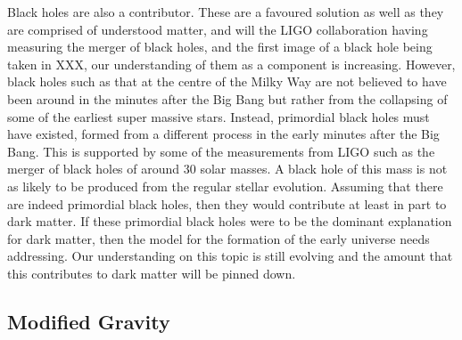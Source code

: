 \par
Black holes are also a contributor. 
These are a favoured solution as well as they are comprised of understood matter, and will the LIGO collaboration having measuring the merger of black holes, and the first image of a black hole being taken in XXX, our understanding of them as a component is increasing.
However, black holes such as that at the centre of the Milky Way are not believed to have been around in the minutes after the Big Bang but rather from the collapsing of some of the earliest super massive stars.
Instead, primordial black holes must have existed, formed from a different process in the early minutes after the Big Bang.
This is supported by some of the measurements from LIGO such as the merger of black holes of around 30 solar masses.
A black hole of this mass is not as likely to be produced from the regular stellar evolution.
Assuming that there are indeed primordial black holes, then they would contribute at least in part to dark matter.
If these primordial black holes were to be the dominant explanation for dark matter, then the model for the formation of the early universe needs addressing.
Our understanding on this topic is still evolving and the amount that this contributes to dark matter will be pinned down.

\subsection{Modified Gravity}
\par

